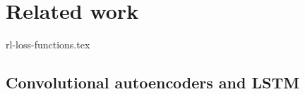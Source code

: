 
\chapter{Related work}\label{RelatedWorkMain}

{rl-loss-functions.tex}

\section{Convolutional autoencoders and LSTM}
